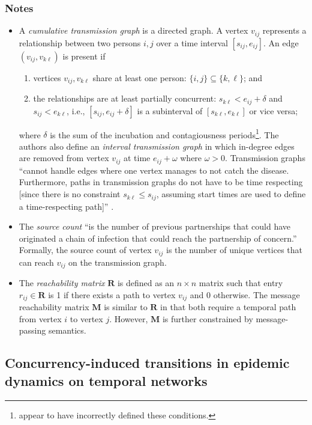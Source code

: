 \subsubsection*{Notes}
\begin{itemize}
\item A \emph{cumulative transmission graph} is a directed graph. A vertex $v_{ij}$ represents a relationship between two persons $i, j$ over a time interval $[s_{ij}, e_{ij}]$. An edge $(v_{ij}, v_{k\ell})$ is present if
	\begin{enumerate}
		\item vertices $v_{ij}, v_{k\ell}$ share at least one person: $\{i, j\} \subseteq \{k, \ell\}$; and
		\item the relationships are at least partially concurrent: $s_{k\ell} < e_{ij} + \delta$ and $s_{ij} < e_{k\ell}$, i.e., $[s_{ij}, e_{ij} + \delta]$ is a subinterval of $[s_{k\ell}, e_{k\ell}]$ or vice versa;
	\end{enumerate}
where $\delta$ is the sum of the incubation and contagiousness periods\footnote{\cite{Holme2012} appear to have incorrectly defined these conditions.}. The authors also define an \emph{interval transmission graph} in which in-degree edges are removed from vertex $v_{ij}$ at time $e
_{ij} + \omega$ where $\omega > 0$. Transmission graphs ``cannot handle edges where one vertex manages to not catch the disease. Furthermore, paths in transmission graphs do not have to be time respecting [since there is no constraint $s_{k\ell} \leq s_{ij}$, assuming start times are used to define a time-respecting path]'' \cite{Holme2012}.
\item The \emph{source count} ``is the number of previous partnerships that could have originated a chain of infection that could reach the partnership of concern.'' Formally, the source count of vertex $v_{ij}$ is the number of unique vertices that can reach $v_{ij}$ on the transmission graph.
\item The \emph{reachability matrix} $\mathbf{R}$ is defined as an $n \times n$ matrix such that entry $r_{ij} \in \mathbf{R}$ is 1 if there exists a path to vertex $v_{ij}$ and 0 otherwise. The message reachability matrix $\mathbf{M}$ is similar to $\mathbf{R}$ in that both require a temporal path from vertex $i$ to vertex $j$. However, $\mathbf{M}$ is further constrained by message-passing semantics.
\end{itemize}

\subsection{Concurrency-induced transitions in epidemic dynamics on temporal networks}
